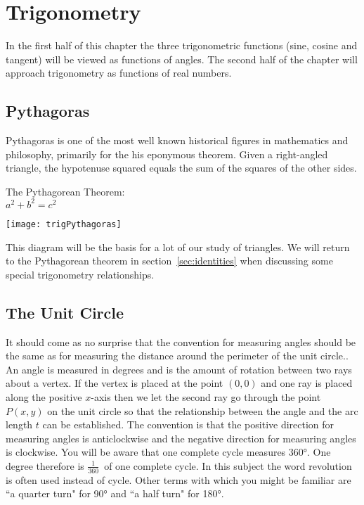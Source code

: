 \chapter{Trigonometry}
In the first half of this chapter the three trigonometric functions (sine, cosine and tangent) will be viewed as functions of angles. The second half of the chapter will approach trigonometry as functions of real numbers.
\section*{Pythagoras}
Pythagoras is one of the most well known historical figures in mathematics and philosophy, primarily for the his eponymous theorem. Given a right-angled triangle, the hypotenuse squared equals the sum of the squares of the other sides.
\begin{tcolorbox}[colback=white]
	\begin{multicols}{2}
		\begin{center}
			The Pythagorean Theorem:\\
			
			\vspace{1cm}$a^2+b^2=c^2$
		\end{center}
\columnbreak
\begin{center}
	\texttt{[image: trigPythagoras]}
\end{center}
	\end{multicols}
\end{tcolorbox}
This diagram will be the basis for a lot of our study of triangles. We will return to the Pythagorean theorem in section~\ref{sec:identities} when discussing some special trigonometry relationships.
\section{The Unit Circle}
It should come as no surprise that the convention for measuring angles should be the same as for measuring
the distance around the perimeter of the unit circle.. An angle is measured in degrees and is the amount of
rotation between two rays about a vertex. If the vertex is placed at the point $\left (0 ,0\right )$ and one ray is placed along the positive $x$-axis then we let the second ray go through the point $P (x ,y)$ on the unit circle so that the relationship between the angle and the arc length $t$ can be established. The convention is that the positive direction for measuring
angles is anticlockwise and the negative direction for measuring angles is clockwise. You will be aware that one complete cycle measures \ang{360}. One degree therefore is $\frac{1}{360}$\ of one complete cycle. In this subject the word revolution is often used instead of cycle. Other terms with which you might be familiar are ``a quarter turn" for \ang{90} and ``a half turn" for \ang{180}. 

